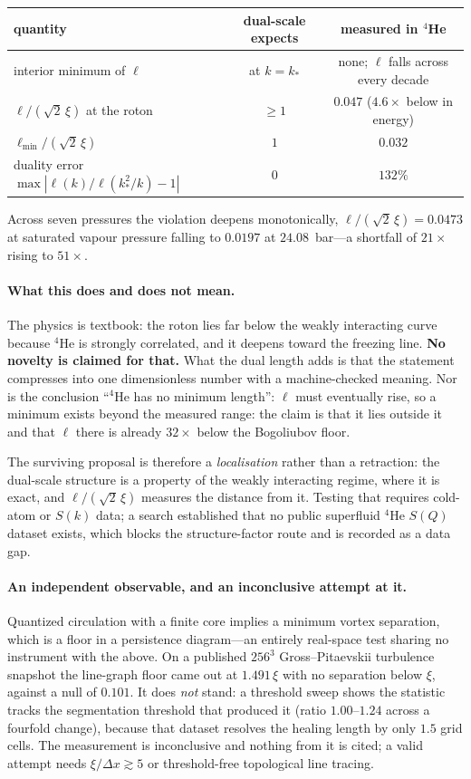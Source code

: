 \documentclass[11pt,a4paper]{article}
\theoremstyle{definition}
\theoremstyle{remark}
\begin{document}
\begin{center}\small
\begin{tabular}{@{}lcc@{}}
\toprule
quantity & dual-scale expects & measured in $^4$He \\
\midrule
interior minimum of $\ell$ & at $k = k_*$ & none; $\ell$ falls across every decade \\
$\ell/(\sqrt2\,\xi)$ at the roton & $\ge 1$ & $\mathbf{0.047}$ ($4.6\times$ below in energy) \\
$\ell_{\min}/(\sqrt2\,\xi)$ & $1$ & $0.032$ \\
duality error $\max|\ell(k)/\ell(k_*^2/k)-1|$ & $0$ & $132\%$ \\
\bottomrule
\end{tabular}
\end{center}

Across seven pressures the violation deepens monotonically, $\ell/(\sqrt2\,\xi) = 0.0473$ at
saturated vapour pressure falling to $0.0197$ at $24.08$~bar---a shortfall of $21\times$
rising to $51\times$.

\paragraph{What this does and does not mean.} The physics is textbook: the roton lies far
below the weakly interacting curve because $^4$He is strongly correlated, and it deepens
toward the freezing line. \textbf{No novelty is claimed for that.} What the dual length adds
is that the statement compresses into one dimensionless number with a machine-checked
meaning. Nor is the conclusion ``$^4$He has no minimum length'': $\ell$ must eventually rise,
so a minimum exists beyond the measured range: the claim is that it lies outside it and that
$\ell$ there is already $32\times$ below the Bogoliubov floor.

The surviving proposal is therefore a \emph{localisation} rather than a retraction: the
dual-scale structure is a property of the weakly interacting regime, where it is exact, and
$\ell/(\sqrt2\,\xi)$ measures the distance from it. Testing that requires cold-atom or
$S(k)$ data; a search established that no public superfluid $^4$He $S(Q)$ dataset exists,
which blocks the structure-factor route and is recorded as a data gap.

\paragraph{An independent observable, and an inconclusive attempt at it.} Quantized
circulation with a finite core implies a minimum vortex separation, which is a floor in a
persistence diagram---an entirely real-space test sharing no instrument with the above. On a
published $256^3$ Gross--Pitaevskii turbulence snapshot the line-graph floor came out at
$1.491\,\xi$ with no separation below $\xi$, against a null of $0.101$. It does \emph{not}
stand: a threshold sweep shows the statistic tracks the segmentation threshold that produced
it (ratio $1.00$--$1.24$ across a fourfold change), because that dataset resolves the healing
length by only $1.5$ grid cells. The measurement is inconclusive and nothing from it is cited;
a valid attempt needs $\xi/\Delta x \gtrsim 5$ or threshold-free topological line tracing.
\end{document}
